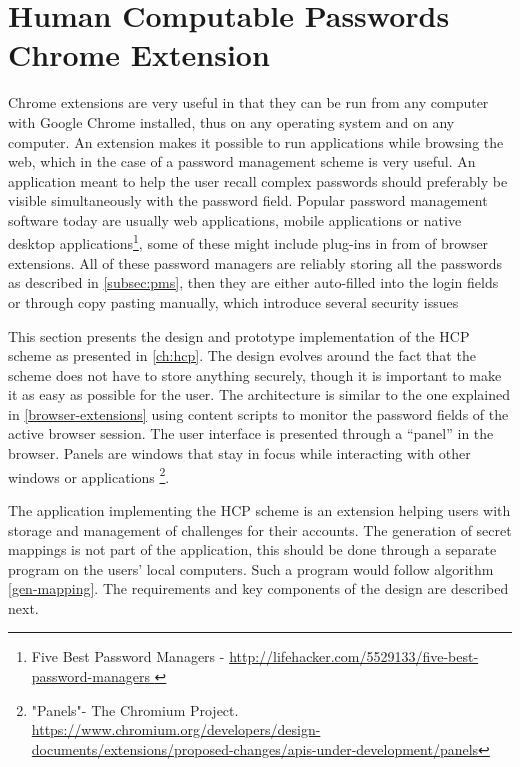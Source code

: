 \section{Human Computable Passwords Chrome Extension}
Chrome extensions are very useful in that they can be run from any computer with Google Chrome installed, thus on any operating system and on any computer. An extension makes it possible to run applications while browsing the web, which in the case of a password management scheme is very useful. An application meant to help the user recall complex passwords should preferably be visible simultaneously with the password field. Popular password management software today are usually web applications, mobile applications or native desktop applications\footnote{Five Best Password Managers - \url{ http://lifehacker.com/5529133/five-best-password-managers }}, some of these might include plug-ins in from of browser extensions. All of these password managers are reliably storing all the passwords as described in \autoref{subsec:pms}, then they are either auto-filled into the login fields or through copy pasting manually, which introduce several security issues~\cite{protecting-browsers, javascript-injection, chrome-extension-dangers, carlini-chrome, liu-chrome, pw-managment-attacks}
\par This section presents the design and prototype implementation of the HCP scheme as presented in \autoref{ch:hcp}. The design evolves around the fact that the scheme does not have to store anything securely, though it is important to make it as easy as possible for the user. The architecture is similar to the one explained in \autoref{browser-extensions} using content scripts to monitor the password fields of the active browser session. The user interface is presented through a ``panel'' in the browser. Panels are windows that stay in focus while interacting with other windows or applications \footnote{"Panels"- The Chromium Project. \url{https://www.chromium.org/developers/design-documents/extensions/proposed-changes/apis-under-development/panels}}.


The application implementing the HCP scheme is an extension helping users with storage and management of challenges for their accounts. The generation of secret mappings is not part of the application, this should be done through a separate program on the users' local computers. Such a program would follow algorithm \ref{gen-mapping}. The requirements and key components of the design are described next.



